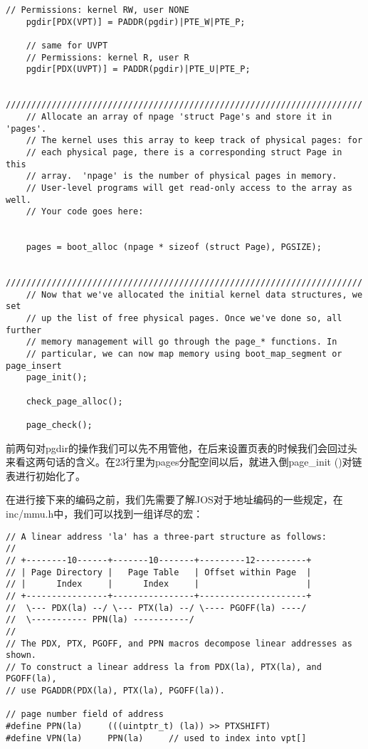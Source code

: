 \documentclass{article}
\newcommand{\funcname}[1]{{\ttfamily \small #1}}
\begin{document}
\begin{CJK*}{UTF8}{gkai}
\begin{lstlisting}[style=ccode, title={\scriptsize \ttfamily \bfseries kern/pmap.c: i386\_vm\_init ()}]
	// Permissions: kernel RW, user NONE
	pgdir[PDX(VPT)] = PADDR(pgdir)|PTE_W|PTE_P;

	// same for UVPT
	// Permissions: kernel R, user R 
	pgdir[PDX(UVPT)] = PADDR(pgdir)|PTE_U|PTE_P;

	//////////////////////////////////////////////////////////////////////
	// Allocate an array of npage 'struct Page's and store it in 'pages'.
	// The kernel uses this array to keep track of physical pages: for
	// each physical page, there is a corresponding struct Page in this
	// array.  'npage' is the number of physical pages in memory.
	// User-level programs will get read-only access to the array as well.
	// Your code goes here:
	

	pages = boot_alloc (npage * sizeof (struct Page), PGSIZE);

	//////////////////////////////////////////////////////////////////////
	// Now that we've allocated the initial kernel data structures, we set
	// up the list of free physical pages. Once we've done so, all further
	// memory management will go through the page_* functions. In
	// particular, we can now map memory using boot_map_segment or page_insert
	page_init();

	check_page_alloc();

	page_check();
\end{lstlisting}

前两句对pgdir的操作我们可以先不用管他，在后来设置页表的时候我们会回过头来看这两句话的含义。在23行里为pages分配空间以后，就进入倒\funcname{page\_init ()}对链表进行初始化了。

在进行接下来的编码之前，我们先需要了解JOS对于地址编码的一些规定，在inc/mmu.h中，我们可以找到一组详尽的宏：

\begin{lstlisting}[style=ccode, firstnumber=16, title={\scriptsize \ttfamily \bfseries inc/mmu.h}]
// A linear address 'la' has a three-part structure as follows:
//
// +--------10------+-------10-------+---------12----------+
// | Page Directory |   Page Table   | Offset within Page  |
// |      Index     |      Index     |                     |
// +----------------+----------------+---------------------+
//  \--- PDX(la) --/ \--- PTX(la) --/ \---- PGOFF(la) ----/
//  \----------- PPN(la) -----------/
//
// The PDX, PTX, PGOFF, and PPN macros decompose linear addresses as shown.
// To construct a linear address la from PDX(la), PTX(la), and PGOFF(la),
// use PGADDR(PDX(la), PTX(la), PGOFF(la)).

// page number field of address
#define PPN(la)		(((uintptr_t) (la)) >> PTXSHIFT)
#define VPN(la)		PPN(la)		// used to index into vpt[]


\end{lstlisting}
\end{CJK*}
\end{document}
